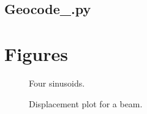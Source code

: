 \documentclass{article}
\begin{document}
\subsection{Geocode\_.py}


%

\clearpage %

\section{Figures}
\begin{figure}[ht!]
\begin{center}
\caption{Four sinusoids.}
\end{center}
\end{figure}

\begin{figure}[ht!]
\begin{center}
\caption{Displacement plot for a beam.}
\end{center}
\end{figure}
\end{document}
